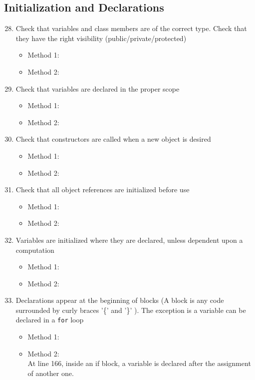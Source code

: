 \subsection{Initialization and Declarations}
\begin{enumerate}
\setcounter{enumi}{27}
	\item Check that variables and class members are of the correct type. Check that they have the right visibility (public/private/protected)
	\begin{itemize}
	 	\item Method 1: \cmark
 		\item Method 2: \cmark
	\end{itemize}
	\item Check that variables are declared in the proper scope
	\begin{itemize}
	 	\item Method 1: \cmark
 		\item Method 2: \cmark
	\end{itemize}
	\item Check that constructors are called when a new object is desired
	\begin{itemize}
	 	\item Method 1: \cmark
 		\item Method 2: \cmark
	\end{itemize}
	\item Check that all object references are initialized before use
	\begin{itemize}
	 	\item Method 1: \cmark
 		\item Method 2: \cmark
	\end{itemize}
	\item Variables are initialized where they are declared, unless dependent upon a computation
	\begin{itemize}
	 	\item Method 1: \cmark
 		\item Method 2: \cmark
	\end{itemize}
	\item Declarations appear at the beginning of blocks (A block is any code surrounded by curly braces '\{' and '\}' ). The exception is a variable can be declared in a \texttt{for} loop
	\begin{itemize}
	 	\item Method 1: \cmark
 		\item Method 2: \xmark\\
 		At line 166, inside an if block, a variable is declared after the assignment of another one.
	\end{itemize}
\end{enumerate}